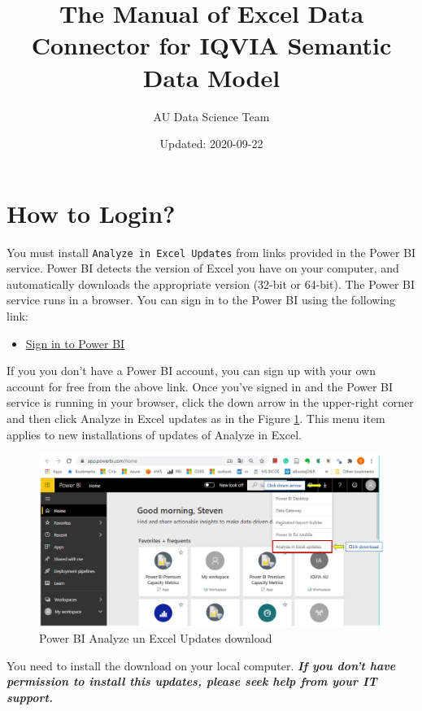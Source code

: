 \documentclass[]{article}
\title{The Manual of Excel Data Connector for IQVIA Semantic Data Model}
\author{AU Data Science Team}
\date{Updated: 2020-09-22}
\providecommand{\tightlist}{%
  \setlength{\itemsep}{0pt}\setlength{\parskip}{0pt}}
\begin{document}
\maketitle

{
\setcounter{tocdepth}{2}
\tableofcontents
}
\hypertarget{how-to-login}{%
\section{How to Login?}\label{how-to-login}}

You must install \texttt{Analyze\ in\ Excel\ Updates} from links provided in the Power BI service. Power BI detects the version of Excel you have on your computer, and automatically downloads the appropriate version (32-bit or 64-bit). The Power BI service runs in a browser. You can sign in to the Power BI using the following link:

\begin{itemize}
\tightlist
\item
  \href{https://app.powerbi.com}{Sign in to Power BI}
\end{itemize}

If you you don't have a Power BI account, you can sign up with your own account for free from the above link. Once you've signed in and the Power BI service is running in your browser, click the down arrow in the upper-right corner and then click Analyze in Excel updates as in the Figure \ref{fig:pbi1}. This menu item applies to new installations of updates of Analyze in Excel.

\begin{figure}
\includegraphics[width=1\linewidth]{image/pbi1} \caption{Power BI Analyze un Excel Updates download}\label{fig:pbi1}
\end{figure}

You need to install the download on your local computer. \emph{\textbf{If you don't have permission to install this updates, please seek help from your IT support.}}
\end{document}
